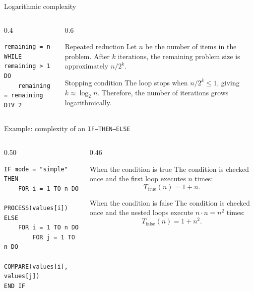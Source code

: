\documentclass[aspectratio=169]{beamer}
\begin{document}
\begin{frame}[fragile]{Logarithmic complexity}
  \begin{columns}[T]
    \begin{column}{0.4\textwidth}
\begin{lstlisting}[style=pseudo]
remaining = n
WHILE remaining > 1 DO
    remaining = remaining DIV 2
\end{lstlisting}
    \end{column}
    \begin{column}{0.6\textwidth}
      \begin{block}{Repeated reduction}
        Let $n$ be the number of items in the problem. After $k$ iterations,
        the remaining problem size is approximately
        $n/2^k$.
      \end{block}
      \begin{exampleblock}{Stopping condition}
        The loop stops when $n/2^k\le1$, giving $k\approx\log_2 n$.
        Therefore, the number of iterations grows logarithmically.
      \end{exampleblock}
    \end{column}
  \end{columns}
\end{frame}


\begin{frame}[fragile]{Example: complexity of an \texttt{IF--THEN--ELSE}}
  \begin{columns}[T]
    \begin{column}{0.50\textwidth}
\begin{lstlisting}[style=pseudo]
IF mode = "simple" THEN
    FOR i = 1 TO n DO
        PROCESS(values[i])
ELSE
    FOR i = 1 TO n DO
        FOR j = 1 TO n DO
            COMPARE(values[i], values[j])
END IF
\end{lstlisting}
    \end{column}
    \begin{column}{0.46\textwidth}
      \begin{block}{When the condition is true}
        The condition is checked once and the first loop executes $n$ times:
        \[
          T_{\mathrm{true}}(n)=1+n.
        \]
      \end{block}
      \begin{exampleblock}{When the condition is false}
        The condition is checked once and the nested loops execute
        $n\cdot n=n^2$ times:
        \[
          T_{\mathrm{false}}(n)=1+n^2.
        \]
      \end{exampleblock}
    \end{column}
  \end{columns}
\end{frame}
\end{document}

